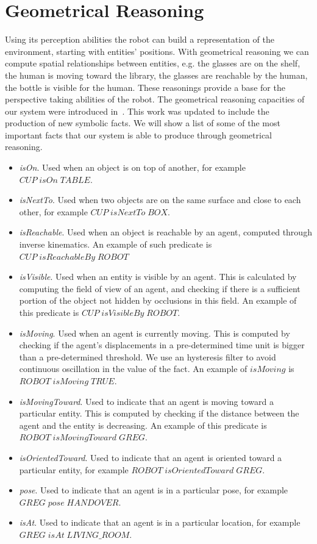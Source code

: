 \section{Geometrical Reasoning}
\label{sec:belief_management-geometrical_reasoning}

Using its perception abilities the robot can build a representation of the environment, starting with entities' positions. With geometrical reasoning we can compute spatial relationships between entities, e.g. the glasses are on the shelf, the human is moving toward the library, the glasses are reachable by the human, the bottle is visible for the human. These reasonings provide a base for the perspective taking abilities of the robot.  The geometrical reasoning capacities of our system were introduced in~\cite{Sisbot2011}. This work was updated to include the production of new symbolic facts. We will show a list of some of the most important facts that our system is able to produce through geometrical reasoning.

\begin{itemize}
\item \textit{isOn}. Used when an object is on top of another, for example $CUP\; isOn\; TABLE$.
\item \textit{isNextTo}. Used when two objects are on the same surface and close to each other, for example $CUP\; isNextTo\; BOX$.
\item \textit{isReachable}. Used when an object is reachable by an agent, computed through inverse kinematics. An example of such predicate is $CUP\; isReachableBy\; ROBOT$
\item \textit{isVisible}. Used when an entity is visible by an agent. This is calculated by computing the field of view of an agent, and checking if there is a sufficient portion of the object not hidden by occlusions in this field. An example of this predicate is $CUP\; isVisibleBy\; ROBOT$.
\item \textit{isMoving}. Used when an agent is currently moving. This is computed by checking if the agent's displacements in a pre-determined time unit is bigger than a pre-determined threshold. We use an hysteresis filter to avoid continuous oscillation in the value of the fact. An example of $isMoving$ is $ROBOT\; isMoving\; TRUE$.
\item \textit{isMovingToward}. Used to indicate that an agent is moving toward a particular entity. This is computed by checking if the distance between the agent and the entity is decreasing. An example of this predicate is $ROBOT\; isMovingToward\; GREG$.
\item \textit{isOrientedToward}. Used to indicate that an agent is oriented toward a particular entity, for example $ROBOT\; isOrientedToward\; GREG$.
\item \textit{pose}. Used to indicate that an agent is in a particular pose, for example $GREG\; pose\; HANDOVER$.
\item \textit{isAt}. Used to indicate that an agent is in a particular location, for example $GREG\; isAt\; LIVING\_ROOM$.
\end{itemize}


